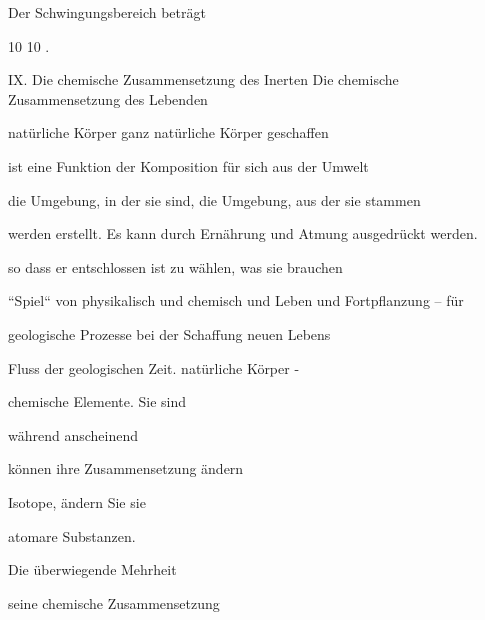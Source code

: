 \documentclass[11pt,a4paper]{book}
\begin{document}
                                   Der Schwingungsbereich beträgt



                                   10 10 .



 



IX. Die chemische Zusammensetzung des Inerten Die chemische Zusammensetzung des Lebenden



natürliche Körper ganz natürliche Körper geschaffen



ist eine Funktion der Komposition für sich aus der Umwelt



die Umgebung, in der sie sind, die Umgebung, aus der sie stammen



werden erstellt. Es kann durch Ernährung und Atmung ausgedrückt werden.



so dass er entschlossen ist zu wählen, was sie brauchen



“Spiel“ von physikalisch und chemisch und Leben und Fortpflanzung -- für



geologische Prozesse bei der Schaffung neuen Lebens



Fluss der geologischen Zeit. natürliche Körper -



                                   chemische Elemente. Sie sind



                                   während anscheinend



                                   können ihre Zusammensetzung ändern



                                   Isotope, ändern Sie sie



                                   atomare Substanzen.



                                   Die überwiegende Mehrheit



                                   seine chemische Zusammensetzung
\end{document}

